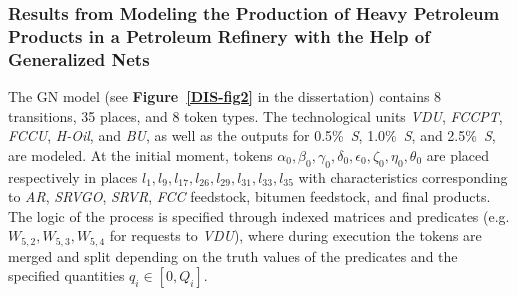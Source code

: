 	\subsubsection{Results from Modeling the Production of Heavy Petroleum Products in a Petroleum Refinery with the Help of Generalized Nets}
	
	\hspace*{2.5em}The GN model (see \textbf{Figure~\ref{DIS-fig2}} in the dissertation) contains 8 transitions, 35 places, and 8 token types. The technological units \textit{VDU}, \textit{FCCPT}, \textit{FCCU}, \textit{H-Oil}, and \textit{BU}, as well as the outputs for 0.5\%~\textit{S}, 1.0\%~\textit{S}, and 2.5\%~\textit{S}, are modeled. At the initial moment, tokens $\alpha_0,\beta_0,\gamma_0,\delta_0,\epsilon_0,\zeta_0,\eta_0,\theta_0$ are placed respectively in places $l_1,l_9,l_{17},l_{26},l_{29},l_{31},l_{33},l_{35}$ with characteristics corresponding to \textit{AR}, \textit{SRVGO}, \textit{SRVR}, \textit{FCC} feedstock, bitumen feedstock, and final products. The logic of the process is specified through indexed matrices and predicates (e.g. $W_{5,2}, W_{5,3}, W_{5,4}$ for requests to \textit{VDU}), where during execution the tokens are merged and split depending on the truth values of the predicates and the specified quantities $q_i \in [0,Q_i]$.
	
